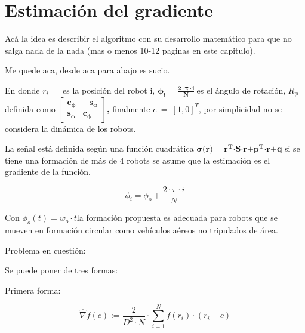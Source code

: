 \newpage
\thispagestyle{empty}
\mbox{}

\chapter{Estimación del gradiente}
\label{ch:chapter3}

Acá la idea es describir el algoritmo con su desarrollo matemático para que no salga nada de la nada (mas o menos 10-12 paginas en este capitulo).


Me quede aca, desde aca para abajo es sucio.

En donde $r_{i}=$ es la posición del robot i, ${\boldsymbol{\phi }}_{\boldsymbol{i}}\boldsymbol{=}\frac{\boldsymbol{2}\cdot\boldsymbol{\pi }\cdot\boldsymbol{i}}{\boldsymbol{N}}\boldsymbol{\ }$es el ángulo de rotación, $R_{\phi }$  definida como \textbf{ }$\left[ \begin{array}{cc} {\boldsymbol{c}}_{\boldsymbol{\phi }} & \boldsymbol{-}{\boldsymbol{s}}_{\boldsymbol{\phi }} \\  {\boldsymbol{s}}_{\boldsymbol{\phi }} & {\boldsymbol{c}}_{\boldsymbol{\phi }} \end{array} \right]$\textbf{, }finalmente $e\ =\ {\left[1,0\right]}^T$, por simplicidad no se considera la dinámica de los robots.



\noindent La señal está definida según una función cuadrática $\boldsymbol{\sigma }\boldsymbol{(}\boldsymbol{r}\boldsymbol{)=}{\boldsymbol{r}}^{\boldsymbol{T}}\boldsymbol{\cdot}\boldsymbol{S}\boldsymbol{\cdot}\boldsymbol{r}\boldsymbol{+}{\boldsymbol{p}}^{\boldsymbol{T}}\boldsymbol{\cdot}\boldsymbol{r}\boldsymbol{+}\boldsymbol{q}$ si se tiene una formación de más de 4 robots se asume que la estimación es el gradiente de la función.

\noindent 
\[{\phi }_i={\phi }_{o}+\frac{2\cdot\pi \cdot{i}}{N} \] 

Con ${\phi }_{o}\left(t\right)=w_{o}\cdot{t}$la formación propuesta es adecuada para robots que se mueven en formación circular como vehículos aéreos no tripulados de área.

Problema en cuestión:

Se puede poner de tres formas:

Primera forma:

\begin{equation*}
	\hat{\nabla}{f}\left(c\right):=\frac{2}{{D}^2\cdot{N}}\cdot\sum_{i=1}^{N}f(r_{i})\cdot(r_{i}-c)
\end{equation*}

